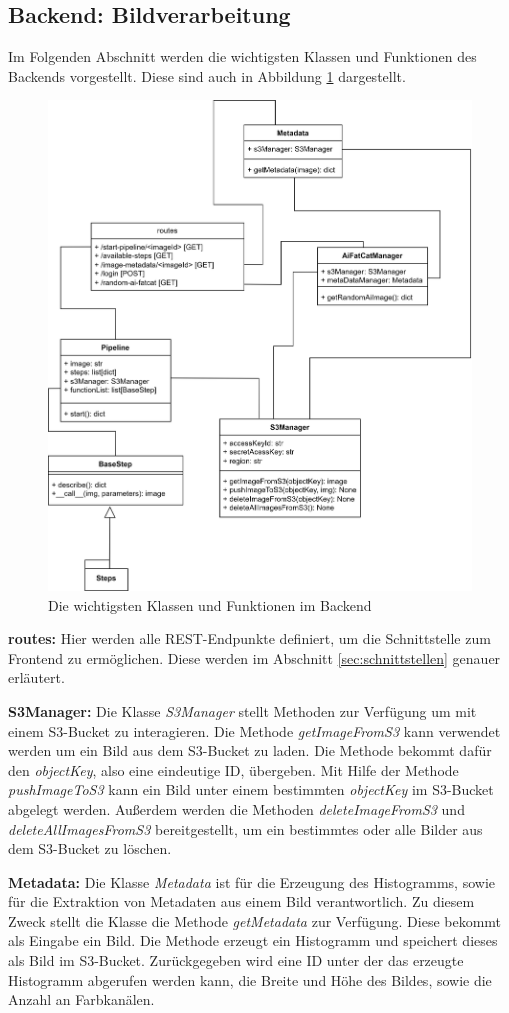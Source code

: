 \subsection{Backend: Bildverarbeitung}
Im Folgenden Abschnitt werden die wichtigsten Klassen und Funktionen des Backends vorgestellt. Diese sind auch in Abbildung \ref{fig:backend} dargestellt.
\FloatBarrier
\begin{figure}
    \centering
    \includegraphics[width=.7\textwidth]{Bilder/BackendBDCC.png}
    \caption{Die wichtigsten Klassen und Funktionen im Backend}
    \label{fig:backend}
\end{figure}
\textbf{routes:} Hier werden alle REST-Endpunkte definiert, um die Schnittstelle zum Frontend zu ermöglichen. Diese werden im Abschnitt \ref{sec:schnittstellen} genauer erläutert. 

\textbf{S3Manager:} Die Klasse \textit{S3Manager} stellt Methoden zur Verfügung um mit einem S3-Bucket zu interagieren. Die Methode \textit{getImageFromS3} kann verwendet werden um ein Bild aus dem S3-Bucket zu laden. Die Methode bekommt dafür den \textit{objectKey}, also eine eindeutige ID, übergeben. Mit Hilfe der Methode \textit{pushImageToS3} kann ein Bild unter einem bestimmten \textit{objectKey} im S3-Bucket abgelegt werden. Außerdem werden die Methoden \textit{deleteImageFromS3} und \textit{deleteAllImagesFromS3} bereitgestellt, um ein bestimmtes oder alle Bilder aus dem S3-Bucket zu löschen. 

\textbf{Metadata:} 
Die Klasse \textit{Metadata} ist für die Erzeugung des Histogramms, sowie für die Extraktion von Metadaten aus einem Bild verantwortlich. 
Zu diesem Zweck stellt die Klasse die Methode \textit{getMetadata} zur Verfügung. 
Diese bekommt als Eingabe ein Bild. Die Methode erzeugt ein Histogramm und speichert dieses als Bild im S3-Bucket. Zurückgegeben wird eine ID unter der das erzeugte Histogramm abgerufen werden kann, die Breite und Höhe des Bildes, sowie die Anzahl an Farbkanälen. 

